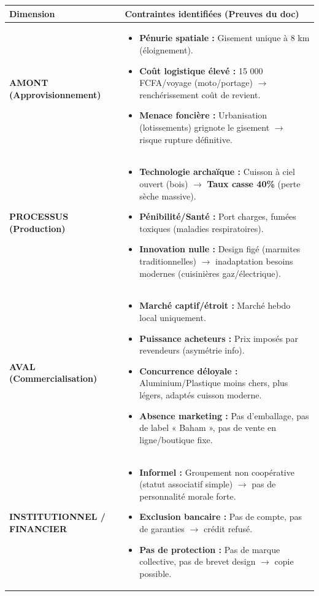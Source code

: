 \documentclass[11pt]{article}
\begin{document}
\begin{exoresolu}
\begin{center}
\begin{tabularx}{\linewidth}{|l|X|}\hline
\textbf{Dimension} & \textbf{Contraintes identifiées (Preuves du doc)} \\ \hline
\textbf{AMONT (Approvisionnement)} & \begin{itemize}\item \textbf{Pénurie spatiale :} Gisement unique à 8 km (éloignement). \item \textbf{Coût logistique élevé :} 15 000 FCFA/voyage (moto/portage) $\rightarrow$ renchérissement coût de revient. \item \textbf{Menace foncière :} Urbanisation (lotissements) grignote le gisement $\rightarrow$ risque rupture définitive.\end{itemize} \\ \hline
\textbf{PROCESSUS (Production)} & \begin{itemize}\item \textbf{Technologie archaïque :} Cuisson à ciel ouvert (bois) $\rightarrow$ \textbf{Taux casse 40\%} (perte sèche massive). \item \textbf{Pénibilité/Santé :} Port charges, fumées toxiques (maladies respiratoires). \item \textbf{Innovation nulle :} Design figé (marmites traditionnelles) $\rightarrow$ inadaptation besoins modernes (cuisinières gaz/électrique).\end{itemize} \\ \hline
\textbf{AVAL (Commercialisation)} & \begin{itemize}\item \textbf{Marché captif/étroit :} Marché hebdo local uniquement. \item \textbf{Puissance acheteurs :} Prix imposés par revendeurs (asymétrie info). \item \textbf{Concurrence déloyale :} Aluminium/Plastique moins chers, plus légers, adaptés cuisson moderne. \item \textbf{Absence marketing :} Pas d'emballage, pas de label « Baham », pas de vente en ligne/boutique fixe.\end{itemize} \\ \hline
\textbf{INSTITUTIONNEL / FINANCIER} & \begin{itemize}\item \textbf{Informel :} Groupement non coopérative (statut associatif simple) $\rightarrow$ pas de personnalité morale forte. \item \textbf{Exclusion bancaire :} Pas de compte, pas de garanties $\rightarrow$ crédit refusé. \item \textbf{Pas de protection :} Pas de marque collective, pas de brevet design $\rightarrow$ copie possible.\end{itemize} \\ \hline
\end{tabularx}
\end{center}


\end{exoresolu}
\end{document}
